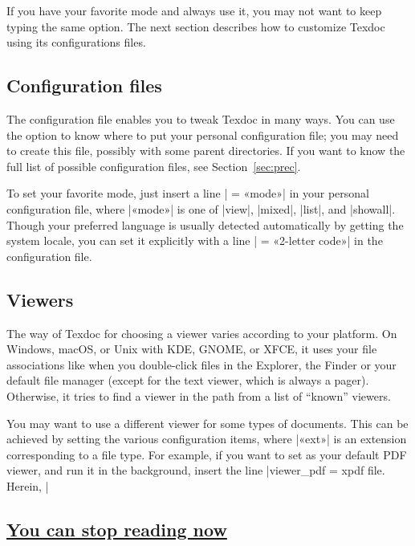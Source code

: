 \documentclass{texdoc-doc}
\begin{document}
If you have your favorite mode and always use it, you may not want to keep
typing the same option. The next section describes how to customize Texdoc
using its configurations files.

\subsection{Configuration files}
\label{sec:quick-file}

The configuration file enables you to tweak Texdoc in many ways. You can use
the  option to know where to put your personal configuration file;
you may need to create this file, possibly with some parent directories. If you
want to know the full list of possible configuration files, see
Section~\ref{sec:prec}.

To set your favorite mode, just insert a line | = «mode»| in your
personal configuration file, where |«mode»| is one of |view|, |mixed|, |list|,
and |showall|. Though your preferred language is usually detected automatically
by getting the system locale, you can set it explicitly with a line
| = «2-letter code»| in the configuration file.

\subsection{Viewers}
\label{sec:viewer}

The way of Texdoc for choosing a viewer varies according to your platform. On
Windows, macOS, or Unix with KDE, GNOME, or XFCE, it uses your file
associations like when you double-click files in the Explorer, the Finder or
your default file manager (except for the text viewer, which is always a
pager). Otherwise, it tries to find a viewer in the path from a list of
``known'' viewers.

You may want to use a different viewer for some types of documents. This can be
achieved by setting the various  configuration items,
where |«ext»| is an extension corresponding to a file type. For example, if
you want to set  as your default PDF viewer, and run it in the
background, insert the line |viewer_pdf = xpdf %
file. Herein, |%

\subsection*{\underline{You can stop reading now}}
\end{document}
